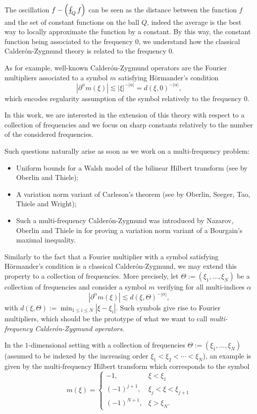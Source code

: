 \documentclass[11pt]{amsart}
\theoremstyle{remark}
\newcommand{\mb}{\medskip\noindent}
\newcommand{\gb}{\bigskip\noindent}
\def\Xint#1{\mathchoice
   {\XXint\displaystyle\textstyle{#1}}%
   {\XXint\textstyle\scriptstyle{#1}}%
   {\XXint\scriptstyle\scriptscriptstyle{#1}}%
   {\XXint\scriptscriptstyle\scriptscriptstyle{#1}}%
   \!\int}
\def\XXint#1#2#3{{\setbox0=\hbox{$#1{#2#3}{\int}$}
     \vcenter{\hbox{$#2#3$}}\kern-.5\wd0}}
\def\aver#1{\Xint-_{#1}}
\begin{document}
The oscillation $f - \left(\aver{Q} f\right)$ can be seen as the distance between the function $f$ and the set of constant functions on the ball $Q$, indeed the average is the best way to locally approximate the function by a constant. By this way, the constant function being associated to the frequency $0$, we understand how the classical Calder\'on-Zygmund theory is related to the frequency $0$.

As for example, well-known Calder\'on-Zygmund operators are the Fourier multipliers associated to a symbol $m$ satisfying H\"ormander's condition
$$ | \partial^\alpha m(\xi)| \lesssim |\xi|^{-|\alpha|}=d(\xi,0)^{-|\alpha|},$$
which encodes regularity assumption of the symbol relatively to the frequency $0$.


\mb
In this work, we are interested in the extension of this theory with respect to a collection of frequencies and we focus on sharp constants relatively to the number of the considered frequencies.

\gb Such questions naturally arise as soon as we work on a multi-frequency problem:
\begin{itemize}
 \item Uniform bounds for a Walsh model of the bilinear Hilbert transform (see \cite{OT} by Oberlin and Thiele);
 \item A variation norm variant of Carleson's theorem (see \cite{OSTTW} by Oberlin, Seeger, Tao, Thiele and Wright);
 \item Such a multi-frequency Calder\'on-Zygmund was introduced by Nazarov, Oberlin and Thiele in \cite{NOT} for proving a variation norm variant of a Bourgain's maximal inequality.
\end{itemize}

Similarly to the fact that a Fourier multiplier with a symbol satisfying H\"ormander's condition is a classical Calder\'on-Zygmund, we may extend this property to a collection of frequencies. More precisely, let $\Theta:=(\xi_1,...,\xi_N)$ be a collection of frequencies and consider a symbol $m$ verifying for all multi-indices $\alpha$
$$ | \partial^\alpha m(\xi)| \lesssim d(\xi,\Theta)^{-|\alpha|},$$
with $d(\xi,\Theta):= \min_{1\leq i \leq N} |\xi-\xi_i|$.
Such symbols give rise to Fourier multipliers, which should be the prototype of what we want to call {\it multi-frequency Calder\'on-Zygmund operators}.

\mb

In the $1$-dimensional setting with a collection of frequencies $\Theta:=(\xi_1,...,\xi_N)$ (assumed to be indexed by the increasing order $\xi_1< \xi_2< \cdots < \xi_N$), an example is given by the multi-frequency Hilbert transform which corresponds to the symbol
$$ m(\xi) = \left\{ \begin{array}{ll}
                     -1, & \xi<\xi_1 \\
                      (-1)^{j+1}, & \xi_j<\xi<\xi_{j+1} \\
                      (-1)^{N+1}, & \xi>\xi_N.
                    \end{array} \right. $$
 
\end{document}
